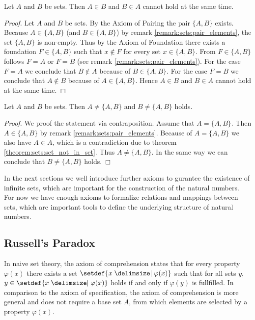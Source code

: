 \begin{theorem}\label{theorem:sets:element_of_antisymmetric}
    Let $A$ and $B$ be sets. Then $A\in B$ and $B\in A$ cannot hold at the same time.
\end{theorem}
\begin{proof}
    Let $A$ and $B$ be sets. By the Axiom of Pairing the pair $\{A,B\}$ exists. Because $A\in \{A,B\}$ (and $B\in \{A,B\}$) by remark \ref{remark:sets:pair_elements}, the set $\{A,B\}$ is non-empty. Thus by the Axiom of Foundation there exists a foundation $F\in \{A,B\}$ such that $x\notin F$ for every set $x\in \{A,B\}$. From $F\in\{A,B\}$ follows $F=A$ or $F=B$ (see remark \ref{remark:sets:pair_elements}). For the case $F=A$ we conclude that $B\notin A$ because of $B\in\{A,B\}$. For the case $F=B$ we conclude that $A\notin B$ because of $A\in\{A,B\}$. Hence $A\in B$ and $B\in A$ cannot hold at the same time.
\end{proof}

\begin{theorem}
    Let $A$ and $B$ be sets. Then $A\neq \{A,B\}$ and $B\neq \{A,B\}$ holds.
\end{theorem}

\begin{proof}
    We proof the statement via contraposition. Assume that $A=\{A,B\}$. Then $A\in\{A,B\}$ by remark \ref{remark:sets:pair_elements}. Because of $A=\{A,B\}$ we also have $A\in A$, which is a contradiction due to theorem \ref{theorem:sets:set_not_in_set}. Thus $A\neq\{A,B\}$. In the same way we can conclude that $B\neq\{A,B\}$ holds.
\end{proof}

In the next sections we well introduce further axioms to gurantee the existence of infinite sets, which are important for the construction of the natural numbers. For now we have enough axioms to formalize relations and mappings between sets, which are important tools to define the underlying structure of natural numbers.

\subsection{Russell's Paradox}

In naive set theory, the axiom of comprehension states that for every property $\varphi(x)$ there exists a set $\setdef{x\given \varphi(x)}$ such that for all sets $y$, $y\in\setdef{x\given \varphi(x)}$ holds if and only if $\varphi(y)$ is fullfilled. In comparison to the axiom of specification, the axiom of comprehension is more general and does not require a base set $A$, from which elements are selected by a property $\varphi(x)$.

